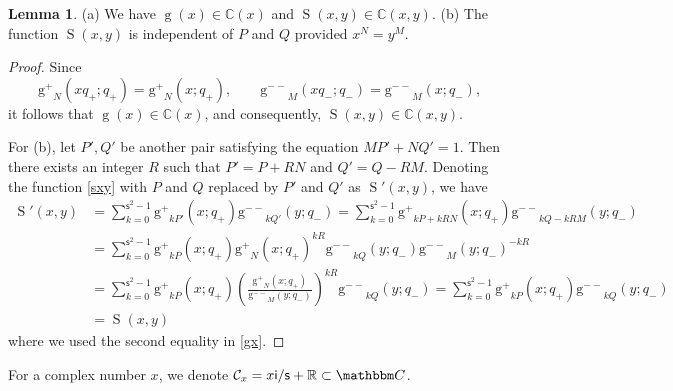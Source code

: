 \documentclass[12pt]{amsart}
\theoremstyle{definition}
\newtheorem{lemma}[theorem]{Lemma}
\def\BC{\mathbbm C}
\newcommand{\im}{\mathsf{i}}
\begin{document}
\begin{lemma}
\label{lem.gg}
\rm{(a)}
We have $\operatorname{g}\!\left(x\right) \in\mathbb{C}(x)$ and
$\operatorname{S}(x,y) \in\mathbb{C}(x,y)$. 
\newline
\rm{(b)}
The function $\operatorname{S}(x,y) $ is independent of $P$ and $Q$ 
provided $x^N=y^M$.
\end{lemma}

\begin{proof}
Since
\begin{equation}
\operatorname{g^+}_{N}\!\left(xq_+;q_+\right)
=\operatorname{g^+}_{N}\!\left(x;q_+\right),\qquad 
\operatorname{g^{--}}_{M}\!\left(xq_-;q_-\right)
=\operatorname{g^{--}}_{M}\!\left(x;q_-\right),
\end{equation}
it follows that $\operatorname{g}\!\left(x\right) \in\mathbb{C}(x)$, and
consequently, $\operatorname{S}(x,y) \in\mathbb{C}(x,y)$.
 
For (b), let $P', Q'$ be another pair satisfying the equation $MP'+NQ'=1$. 
Then there exists an integer $R$ such that $P'=P+RN$ and $Q'=Q-RM$. Denoting 
the function \eqref{sxy} with $P$ and $Q$ replaced by $P'$ and $Q'$ as 
$\operatorname{S}'(x,y)$, we have
\begin{align*}
 \operatorname{S}'(x,y) 
&=\sum_{k=0}^{\mathsf{s}^2-1}\operatorname{g^+}_{kP'}\!
\left(x;q_+\right)\operatorname{g^{--}}_{kQ'}\!
\left(y;q_-\right)
=\sum_{k=0}^{\mathsf{s}^2-1}\operatorname{g^+}_{kP+kRN}\!
\left(x;q_+\right)\operatorname{g^{--}}_{kQ-kRM}\!
\left(y;q_-\right)\\
&=\sum_{k=0}^{\mathsf{s}^2-1}\operatorname{g^+}_{kP}\!
\left(x;q_+\right) \operatorname{g^+}_{N}\!
\left(x;q_+\right)^{kR}\operatorname{g^{--}}_{kQ}\!
\left(y;q_-\right)\operatorname{g^{--}}_{M}\!
\left(y;q_-\right)^{-kR}\\
&=\sum_{k=0}^{\mathsf{s}^2-1}\operatorname{g^+}_{kP}\!
\left(x;q_+\right) \left(\frac{\operatorname{g^+}_{N}\!
\left(x;q_+\right)}{\operatorname{g^{--}}_{M}\!
\left(y;q_-\right)}\right)^{kR}\operatorname{g^{--}}_{kQ}\!
\left(y;q_-\right)
=\sum_{k=0}^{\mathsf{s}^2-1}\operatorname{g^+}_{kP}\!
\left(x;q_+\right)\operatorname{g^{--}}_{kQ}\!
\left(y;q_-\right) \\
&=\operatorname{S}(x,y)
\end{align*}
where we used the second equality in \eqref{gx}.
\end{proof}
For a complex number $x$, we denote 
$\mathcal{C}_x= x\im/\mathsf{s}+\mathbb{R}\subset \BC$.
\end{document}
